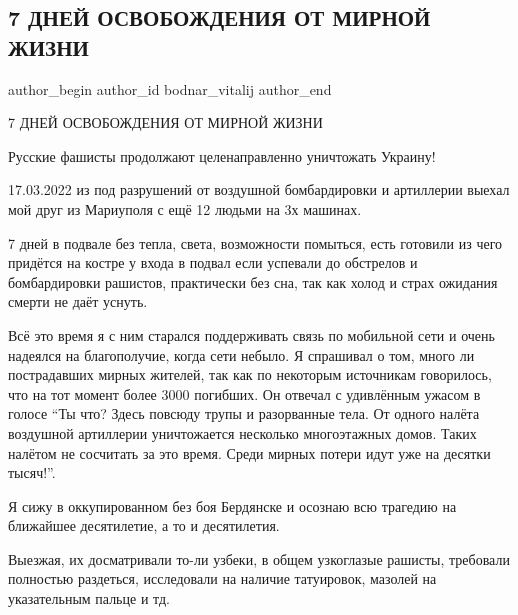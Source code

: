  
 
 
 
 
 
\subsection{7 ДНЕЙ ОСВОБОЖДЕНИЯ ОТ МИРНОЙ ЖИЗНИ}
\label{sec:19_03_2022.fb.bodnar_vitalij.1.7_dnej_osvobozhdenia}
 
\ifcmt
 author_begin
   author_id bodnar_vitalij
 author_end
\fi

7 ДНЕЙ ОСВОБОЖДЕНИЯ ОТ МИРНОЙ ЖИЗНИ

Русские фашисты продолжают целенаправленно уничтожать Украину! 

17.03.2022 из под разрушений от воздушной бомбардировки и артиллерии выехал мой
друг из Мариуполя с ещё 12 людьми на 3х машинах. 

7 дней в подвале без тепла, света, возможности помыться, есть готовили из чего
придётся на костре у входа в подвал если успевали до обстрелов и бомбардировки
рашистов, практически без сна, так как холод и страх ожидания смерти не даёт
уснуть. 

Всё это время я с ним старался поддерживать связь по мобильной сети и очень
надеялся на благополучие, когда сети небыло. Я спрашивал о том, много ли
пострадавших мирных жителей, так как по некоторым источникам говорилось, что на
тот момент более 3000 погибших. Он отвечал с удивлённым ужасом в голосе \enquote{Ты
что? Здесь повсюду трупы и разорванные тела. От одного налёта воздушной
артиллерии уничтожается несколько многоэтажных домов. Таких налётом не
сосчитать за это время. Среди мирных потери идут уже на десятки тысяч!}.

Я сижу в оккупированном без боя Бердянске и осознаю всю трагедию на ближайшее
десятилетие, а то и десятилетия. 

Выезжая, их досматривали то-ли узбеки, в общем узкоглазые рашисты, требовали
полностью раздеться, исследовали на наличие татуировок, мазолей на указательным
пальце и тд.

